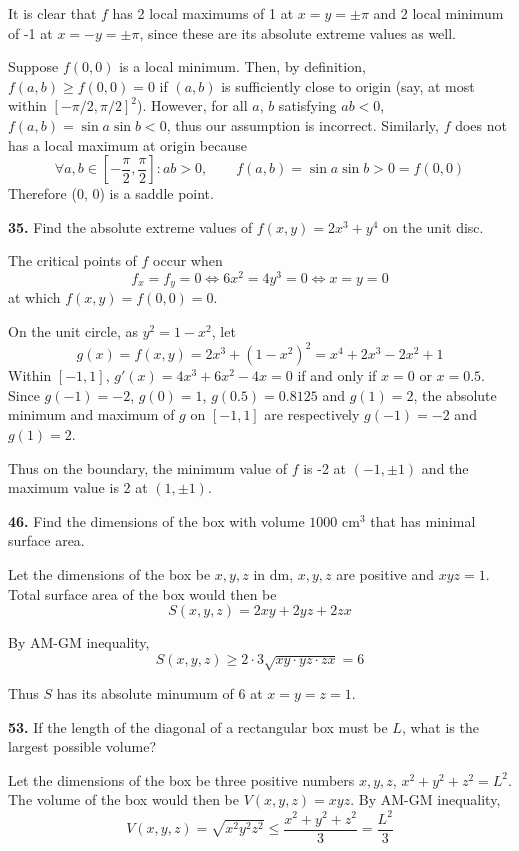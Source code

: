 \documentclass[a4paper,12pt]{article}
\newcommand{\exercise}[1]{\noindent\textbf{#1.}}
\begin{document}
It is clear that $f$ has 2 local maximums of 1 at $x = y = \pm\pi$
and 2 local minimum of -1 at $x = -y = \pm\pi$, since these are
its absolute extreme values as well.

Suppose $f(0, 0)$ is a local minimum. Then, by definition,
$f(a, b) \geq f(0, 0) = 0$ if $(a, b)$ is sufficiently close to origin
(say, at most within $[-\pi/2, \pi/2]^2$). However, for all $a$, $b$
satisfying $ab < 0$, $f(a, b) = \sin a\sin b < 0$, thus our assumption
is incorrect. Similarly, $f$ does not has a local maximum at origin because
\[\forall a, b \in \left[-\frac{\pi}{2}, \frac{\pi}{2}\right]: ab > 0,
\qquad f(a, b) = \sin a\sin b > 0 = f(0, 0)\]
Therefore (0, 0) is a saddle point.

\exercise{35} Find the absolute extreme values of $f(x, y) = 2x^3 + y^4$
on the unit disc.

The critical points of $f$ occur when
\[f_x = f_y = 0 \iff 6x^2 = 4y^3 = 0 \iff x = y = 0\]
at which $f(x, y) = f(0, 0) = 0$.

On the unit circle, as $y^2 = 1 - x^2$, let
\[g(x) = f(x, y) = 2x^3 + (1 - x^2)^2 = x^4 + 2x^3 - 2x^2 + 1\]
Within $[-1, 1]$, $g'(x) = 4x^3 + 6x^2 - 4x = 0$ if and only if
$x = 0$ or $x = 0.5$. Since $g(-1) = -2$, $g(0) = 1$, $g(0.5) = 0.8125$
and $g(1) = 2$, the absolute minimum and maximum of $g$ on $[-1, 1]$
are respectively $g(-1) = -2$ and $g(1) = 2$.

Thus on the boundary, the minimum value of $f$ is -2 at $(-1, \pm 1)$
and the maximum value is 2 at $(1, \pm 1)$.

\exercise{46} Find the dimensions of the box with volume $1000\text{ cm}^3$
that has minimal surface area.

Let the dimensions of the box be $x, y, z$ in dm, $x, y, z$ are positive
and $xyz = 1$. Total surface area of the box would then be
\[S(x, y, z) = 2xy + 2yz + 2zx\]

By AM-GM inequality,
\[S(x, y, z) \geq 2\cdot 3\sqrt{xy\cdot yz\cdot zx} = 6\]

Thus $S$ has its absolute minumum of 6 at $x = y = z = 1$.

\exercise{53} If the length of the diagonal of a rectangular box must be $L$,
what is the largest possible volume?

Let the dimensions of the box be three positive numbers $x, y, z$,
$x^2 + y^2 + z^2 = L^2$. The volume of the box would then be
$V(x, y, z) = xyz$. By AM-GM inequality,
\[V(x, y, z) = \sqrt{x^2 y^2 z^2} \leq \frac{x^2 + y^2 + z^2}{3}
= \frac{L^2}{3}\]
\end{document}
